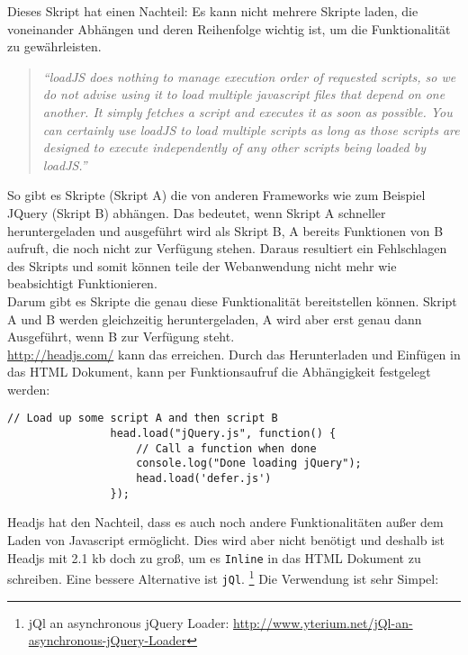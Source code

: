 			Dieses Skript hat einen Nachteil: Es kann nicht mehrere Skripte laden, die voneinander Abhängen und deren Reihenfolge wichtig ist, um die Funktionalität zu gewährleisten. 

			\begin{quote}
				\textit{"`loadJS does nothing to manage execution order of requested scripts, so we do not advise using it to load multiple javascript files that depend on one another. It simply fetches a script and executes it as soon as possible. You can certainly use loadJS to load multiple scripts as long as those scripts are designed to execute independently of any other scripts being loaded by loadJS."'\autocite{deferJS}}
			\end{quote}

			So gibt es Skripte (Skript A) die von anderen Frameworks wie zum Beispiel JQuery (Skript B) abhängen. Das bedeutet, wenn Skript A schneller heruntergeladen und ausgeführt wird als Skript B, A bereits Funktionen von B aufruft, die noch nicht zur Verfügung stehen. Daraus resultiert ein Fehlschlagen des Skripts und somit können teile der Webanwendung nicht mehr wie beabsichtigt Funktionieren.\\

			Darum gibt es Skripte die genau diese Funktionalität bereitstellen können. Skript A und B werden gleichzeitig heruntergeladen, A wird aber erst genau dann Ausgeführt, wenn B zur Verfügung steht.\\

			\url{http://headjs.com/} kann das erreichen. Durch das Herunterladen und Einfügen in das HTML Dokument, kann per Funktionsaufruf die Abhängigkeit festgelegt werden:

			\begin{lstlisting}[captionpos=b, caption=Headjs dependency loading (Listing nach http://headjs.com/), label=lst:headjs]
				// Load up some script A and then script B
				head.load("jQuery.js", function() {
				    // Call a function when done
				    console.log("Done loading jQuery");
				    head.load('defer.js')
				});
			\end{lstlisting}

			Headjs hat den Nachteil, dass es auch noch andere Funktionalitäten außer dem Laden von Javascript ermöglicht. Dies wird aber nicht benötigt und deshalb ist Headjs mit 2.1 kb doch zu groß, um es \texttt{Inline} in das HTML Dokument zu schreiben. Eine bessere Alternative ist \texttt{jQl}. \footnote{jQl an asynchronous jQuery Loader: \url{http://www.yterium.net/jQl-an-asynchronous-jQuery-Loader}}
			Die Verwendung ist sehr Simpel:

